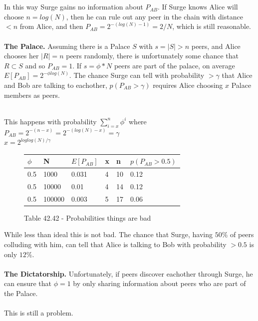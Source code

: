 \documentclass{paper}
\begin{document}
\\\\In this way Surge gains no information about $P_{AB}$. If Surge knows Alice will choose $n = log(N)$, then he can rule out any peer in the chain with distance $< n$ from Alice, and then $P_{AB} = 2^{-(log(N)-1)} = 2/N$, which is still reasonable. 
\\\\
\textbf{The Palace.} Assuming there is a Palace $S$ with $s = |S| > n$ peers, and Alice chooses her $|R| = n$ peers randomly, there is unfortunately some chance that $R \subset S$ and so $P_{AB} = 1$. If $s = \phi*N$ peers are part of the palace, on average $E[P_{AB}] = 2^{-\phi log(N)}$. The chance Surge can tell with probability $> \gamma$ that Alice and Bob are talking to eachother, $p(P_{AB} > \gamma)$ requires Alice choosing $x$ Palace members as peers. 


\\This happens with probability $\sum\limits_{i=x}^n\phi^i$ where 
\\ $P_{AB} = 2^{-(n - x)} = 2^{-(log(N) - x)} = \gamma$
\\ $x = 2^{loglog(N)/\gamma}$

\begin{figure}[ht]
    \begin{tabular}{| l | l | l | l | l | l |}
      \hline
      $\phi$ & N & $E[P_{AB}]$ & x & n & $p(P_{AB} > 0.5)$ \\\hline
      0.5 & 1000 & 0.031 & 4 & 10 & 0.12\\
      0.5 & 10000 & 0.01 & 4 & 14 & 0.12\\
      0.5 & 100000 & 0.003 & 5 & 17 & 0.06\\
      \hline
    \end{tabular}
    \caption{Table 42.42 - Probabilities things are bad}
\end{figure}

While less than ideal this is not bad. The chance that Surge, having $50\%$ of peers colluding with him, can tell that Alice is talking to Bob with probability $> 0.5$ is only $12\%$. 
\\\\
\textbf{The Dictatorship.}
Unfortunately, if peers discover eachother through Surge, he can ensure that $\phi = 1$ by only sharing information about peers who are part of the Palace. 
\\\\
This is still a problem.
\end{document}
